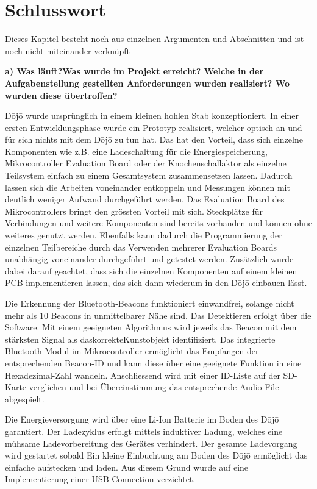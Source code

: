 \section{Schlusswort} \label{sec:schlusswort}

Dieses Kapitel besteht noch aus einzelnen Argumenten und Abschnitten und ist noch nicht miteinander verknüpft

\textbf{a) Was läuft?Was wurde im Projekt erreicht? Welche in der Aufgabenstellung gestellten Anforderungen wurden realisiert? Wo wurden diese übertroffen?}
 
Dōjō wurde ursprünglich in einem kleinen hohlen Stab konzeptioniert. In einer ersten Entwicklungsphase wurde ein Prototyp realisiert, welcher optisch an und für sich nichts mit dem Dōjō zu tun hat. Das hat den Vorteil, dass sich einzelne Komponenten wie z.B. eine Ladeschaltung für die Energiespeicherung, Mikrocontroller Evaluation Board oder der Knochenschallaktor als einzelne Teilsystem einfach zu einem Gesamtsystem zusammensetzen lassen. Dadurch lassen sich die Arbeiten voneinander entkoppeln und Messungen können mit deutlich weniger Aufwand durchgeführt werden. Das Evaluation Board des Mikrocontrollers bringt den grössten Vorteil mit sich. Steckplätze für Verbindungen und weitere Komponenten sind bereits vorhanden und können ohne weiteres genutzt werden. Ebenfalls kann dadurch die Programmierung der einzelnen Teilbereiche durch das Verwenden mehrerer Evaluation Boards unabhängig voneinander durchgeführt und getestet werden. Zusätzlich wurde dabei darauf geachtet, dass sich die einzelnen Komponenten auf einem kleinen PCB implementieren lassen, das sich dann wiederum in den Dōjō einbauen lässt.
 
Die Erkennung der Bluetooth-Beacons funktioniert einwandfrei, solange nicht mehr als 10 Beacons in unmittelbarer Nähe sind. Das Detektieren erfolgt über die Software. Mit einem geeigneten Algorithmus wird jeweils das Beacon mit dem stärksten Signal als das\glqq korrekte\grqq Kunstobjekt identifiziert. Das integrierte Bluetooth-Modul im Mikrocontroller ermöglicht das Empfangen der entsprechenden Beacon-ID und kann diese über eine geeignete Funktion in eine Hexadezimal-Zahl wandeln. Anschliessend wird mit einer ID-Liste auf der SD-Karte verglichen und bei Übereinstimmung das entsprechende Audio-File abgespielt.
 
Die Energieversorgung wird über eine Li-Ion Batterie im Boden des Dōjō garantiert. Der Ladezyklus erfolgt mittels induktiver Ladung, welches eine mühsame Ladevorbereitung des Gerätes verhindert. Der gesamte Ladevorgang wird gestartet sobald 
Ein kleine Einbuchtung am Boden des Dōjō ermöglicht das einfache aufstecken und laden. Aus diesem Grund wurde auf eine Implementierung einer USB-Connection verzichtet.
 
